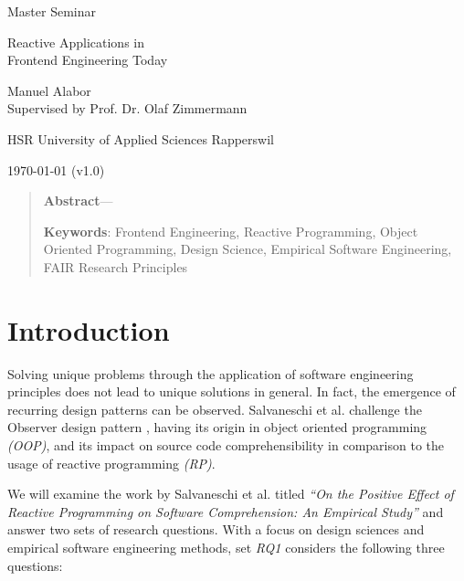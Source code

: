\documentclass[12pt,a4paper]{article}
\newcommand{\version}{v1.0}
\begin{document}
\begin{centering}
	\Large{Master Seminar}
	\par
	\Huge{Reactive Applications in\\Frontend Engineering Today}
	\par
	\vspace{2ex}

	\normalsize{
		Manuel Alabor\\
		Supervised by Prof. Dr. Olaf Zimmermann\\
		\par
		\vspace{2ex}
		HSR University of Applied Sciences Rapperswil\\
		\par
		\vspace{2ex}
		\today{} (\version)
	}
	\par
	\vspace{2ex}

	\begin{quotation}
		\small{
			\noindent\textbf{Abstract}---
		}
		\par
		\vspace{2ex}

		\small{
			\noindent\textbf{Keywords}: Frontend Engineering, Reactive Programming, Object Oriented Programming, Design Science, Empirical Software Engineering, FAIR Research Principles
		}
		\par
		\vspace{4ex}
	\end{quotation}
\end{centering}

\section{Introduction}
Solving unique problems through the application of software engineering principles does not lead to unique solutions in general. In fact, the emergence of recurring design patterns can be observed. Salvaneschi et al. \cite{7827078} challenge the Observer design pattern \cite{gamma1995design}, having its origin in object oriented programming \emph{(OOP)}, and its impact on source code comprehensibility in comparison to the usage of reactive programming \emph{(RP)}.

We will examine the work by Salvaneschi et al. titled \emph{``On the Positive Effect of Reactive Programming on Software Comprehension: An Empirical Study''} \cite{7827078} and answer two sets of research questions. With a focus on design sciences and empirical software engineering methods, set \emph{RQ1} considers the following three questions:
\end{document}
